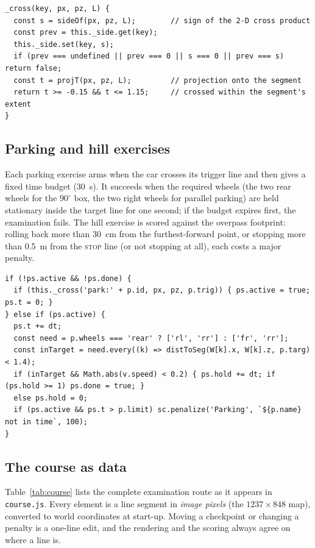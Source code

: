 \documentclass[11pt]{article}
\newcommand{\code}[1]{\texttt{#1}}
\begin{document}
\begin{lstlisting}[caption={Segment-crossing test (\code{exam.js}).}]
_cross(key, px, pz, L) {
  const s = sideOf(px, pz, L);        // sign of the 2-D cross product
  const prev = this._side.get(key);
  this._side.set(key, s);
  if (prev === undefined || prev === 0 || s === 0 || prev === s) return false;
  const t = projT(px, pz, L);         // projection onto the segment
  return t >= -0.15 && t <= 1.15;     // crossed within the segment's extent
}
\end{lstlisting}

\subsection{Parking and hill exercises}

Each parking exercise arms when the car crosses its trigger line and then gives
a fixed time budget (30~s). It succeeds when the required wheels (the two rear
wheels for the $90^\circ$ box, the two right wheels for parallel parking) are
held stationary inside the target line for one second; if the budget expires
first, the examination fails. The hill exercise is scored against the overpass
footprint: rolling back more than \SI{30}{cm} from the furthest-forward point,
or stopping more than \SI{0.5}{m} from the \textsc{stop} line (or not stopping
at all), each costs a major penalty.

\begin{lstlisting}[caption={Timed parking evaluation (\code{exam.js}).}]
if (!ps.active && !ps.done) {
  if (this._cross('park:' + p.id, px, pz, p.trig)) { ps.active = true; ps.t = 0; }
} else if (ps.active) {
  ps.t += dt;
  const need = p.wheels === 'rear' ? ['rl', 'rr'] : ['fr', 'rr'];
  const inTarget = need.every((k) => distToSeg(W[k].x, W[k].z, p.targ) < 1.4);
  if (inTarget && Math.abs(v.speed) < 0.2) { ps.hold += dt; if (ps.hold >= 1) ps.done = true; }
  else ps.hold = 0;
  if (ps.active && ps.t > p.limit) sc.penalize('Parking', `${p.name} not in time`, 100);
}
\end{lstlisting}

\subsection{The course as data}

Table~\ref{tab:course} lists the complete examination route as it appears in
\code{course.js}. Every element is a line segment in \emph{image pixels} (the
$1237\times848$ map), converted to world coordinates at start-up. Moving a
checkpoint or changing a penalty is a one-line edit, and the rendering and the
scoring always agree on where a line is.
\end{document}
